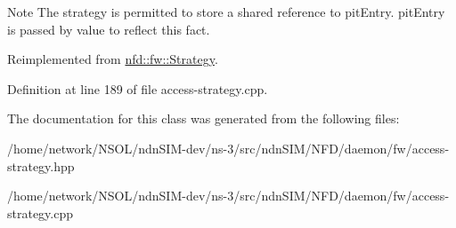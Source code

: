 \begin{DoxyNote}{Note}
The strategy is permitted to store a shared reference to pit\+Entry. pit\+Entry is passed by value to reflect this fact. 
\end{DoxyNote}


Reimplemented from \hyperlink{classnfd_1_1fw_1_1Strategy_a31387ec5c8204841e407bced9902c203}{nfd\+::fw\+::\+Strategy}.



Definition at line 189 of file access-\/strategy.\+cpp.



The documentation for this class was generated from the following files\+:\begin{DoxyCompactItemize}
\item 
/home/network/\+N\+S\+O\+L/ndn\+S\+I\+M-\/dev/ns-\/3/src/ndn\+S\+I\+M/\+N\+F\+D/daemon/fw/access-\/strategy.\+hpp\item 
/home/network/\+N\+S\+O\+L/ndn\+S\+I\+M-\/dev/ns-\/3/src/ndn\+S\+I\+M/\+N\+F\+D/daemon/fw/access-\/strategy.\+cpp\end{DoxyCompactItemize}
